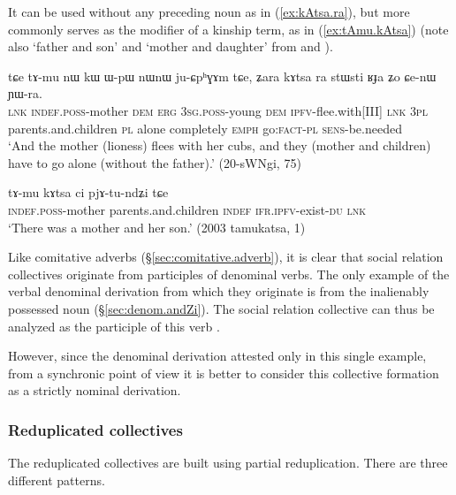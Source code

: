 It can be used without any preceding noun as in (\ref{ex:kAtsa.ra}), but more commonly serves as the modifier of a kinship term, as in (\ref{ex:tAmu.kAtsa}) (note also  `father and son' and  `mother and daughter' from  and ).

\begin{exe}
\ex \label{ex:kAtsa.ra}
\gll tɕe tɤ-mu nɯ kɯ ɯ-pɯ nɯnɯ ju-ɕpʰɣɤm tɕe, ʑara kɤtsa ra stɯsti ʁɟa ʑo ɕe-nɯ ɲɯ-ra. \\
\textsc{lnk} \textsc{indef}.\textsc{poss}-mother \textsc{dem} \textsc{erg} \textsc{3sg}.\textsc{poss}-young \textsc{dem} \textsc{ipfv}-flee.with[III] \textsc{lnk} \textsc{3pl} parents.and.children \textsc{pl} alone completely \textsc{emph} go:\textsc{fact}-\textsc{pl} \textsc{sens}-be.needed \\
\glt `And the mother (lioness) flees with her cubs, and they (mother and children) have to go alone (without the father).' (20-sWNgi, 75)
\end{exe}

\begin{exe}
\ex \label{ex:tAmu.kAtsa}
\gll tɤ-mu kɤtsa ci pjɤ-tu-ndʑi tɕe \\
\textsc{indef}.\textsc{poss}-mother  parents.and.children \textsc{indef} \textsc{ifr}.\textsc{ipfv}-exist-\textsc{du} \textsc{lnk} \\
\glt `There was a mother and her son.' (2003 tamukatsa, 1)
\end{exe}

Like comitative adverbs (§\ref{sec:comitative.adverb}), it is clear that social relation collectives originate from participles of denominal verbs. The only example of the verbal denominal  derivation from which they originate is  from the inalienably possessed noun  (§\ref{sec:denom.andZi}). The social relation collective  can thus be analyzed as the participle of this verb .  

However, since the  denominal derivation attested only in this single example, from a synchronic point of view it is better to consider this collective formation as a strictly nominal derivation.

\subsubsection{Reduplicated collectives} \label{sec:redp.coll}
The reduplicated collectives are built using partial reduplication. There are three different patterns.
 
